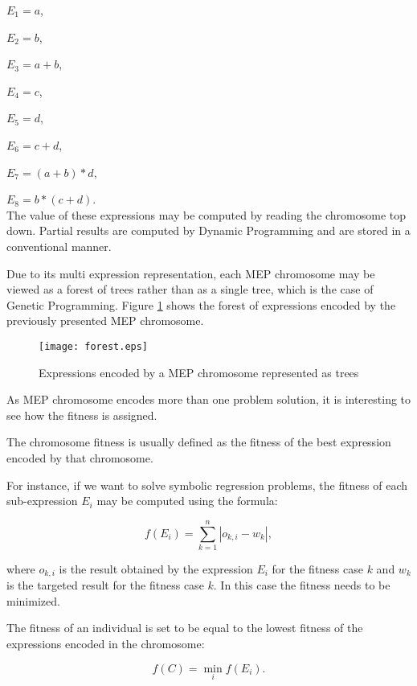 \documentclass [11pt]{article}
\begin{document}
$E_{1}=a$,

$E_{2}=b$,

$E_{3}=a+b$,

$E_{4}=c$,

$E_{5}=d$,

$E_{6}=c+d$,

$E_{7} = (a+b) * d$,

$E_{8}=b*(c+d)$.\\

The value of these expressions may be computed by reading the chromosome top 
down. Partial results are computed by Dynamic Programming \cite{bellman1} and are stored 
in a conventional manner.

Due to its multi expression representation, each MEP chromosome may be 
viewed as a forest of trees rather than as a single tree, which is the case 
of Genetic Programming. Figure \ref{mep:fig1} shows the forest of expressions encoded by the previously presented MEP chromosome. 

\begin{figure}[htbp]
\centerline{\texttt{[image: forest.eps]}}
\label{mep:fig1}
\caption{Expressions encoded by a MEP chromosome represented as trees}
\end{figure}


As MEP chromosome encodes more than one problem solution, it is interesting 
to see how the fitness is assigned. 

The chromosome fitness is usually defined as the fitness of the best 
expression encoded by that chromosome.

For instance, if we want to solve symbolic regression problems, the fitness 
of each sub-expression $E_{i}$ may be computed using the formula:


\begin{equation}
\label{eq1}
f(E_i ) = \sum\limits_{k = 1}^n {\left| {o_{k,i} - w_k } \right|} ,
\end{equation}


where $o_{k,i}$ is the result obtained by the expression $E_{i}$ for the 
fitness case $k$ and $w_{k}$ is the targeted result for the fitness case $k$. In 
this case the fitness needs to be minimized.

The fitness of an individual is set to be equal to the lowest fitness of the 
expressions encoded in the chromosome:


\begin{equation}
\label{eq2}
f(C) = \mathop {\min }\limits_i f(E_i).
\end{equation}
\end{document}
